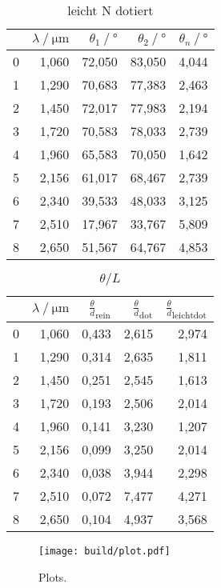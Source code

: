 \begin{table}
    \centering
    \begin{tabular}{lrrrr}
        \toprule
        {} &  $\lambda \:/\: \si{\micro\metre}$ &  $\theta_1 \:/\: °$ &  $\theta_2 \:/\: °$ &  $\theta_n  \:/\: °$ \\
        \midrule
        0 &   1,060 &   72,050 &   83,050 &    4,044 \\
        1 &   1,290 &   70,683 &   77,383 &    2,463 \\
        2 &   1,450 &   72,017 &   77,983 &    2,194 \\
        3 &   1,720 &   70,583 &   78,033 &    2,739 \\
        4 &   1,960 &   65,583 &   70,050 &    1,642 \\
        5 &   2,156 &   61,017 &   68,467 &    2,739 \\
        6 &   2,340 &   39,533 &   48,033 &    3,125 \\
        7 &   2,510 &   17,967 &   33,767 &    5,809 \\
        8 &   2,650 &   51,567 &   64,767 &    4,853 \\
        \bottomrule
    \end{tabular}
    \caption{leicht N dotiert}
    \label{tab:leichtndotiert}
\end{table}

\begin{table}
    \centering
    \begin{tabular}{lrrrr}
        \toprule
        {} &  $\lambda \:/\: \si{\micro\metre}$ &  $\frac{\theta}{d}_\text{rein}$ &  $\frac{\theta}{d}_\text{dot}$ &  $\frac{\theta}{d}_\text{leichtdot}$ \\
        \midrule
        0 &   1,060 &         0,433 &        2,615 &              2,974 \\
        1 &   1,290 &         0,314 &        2,635 &              1,811 \\
        2 &   1,450 &         0,251 &        2,545 &              1,613 \\
        3 &   1,720 &         0,193 &        2,506 &              2,014 \\
        4 &   1,960 &         0,141 &        3,230 &              1,207 \\
        5 &   2,156 &         0,099 &        3,250 &              2,014 \\
        6 &   2,340 &         0,038 &        3,944 &              2,298 \\
        7 &   2,510 &         0,072 &        7,477 &              4,271 \\
        8 &   2,650 &         0,104 &        4,937 &              3,568 \\
        \bottomrule
    \end{tabular}
    \caption{$\theta/L$}
    \label{tab:thetaL}
\end{table}


\begin{figure}[H]
    \centering
    \texttt{[image: build/plot.pdf]}
    \caption{Plots. }
    \label{fig:plots}
\end{figure}